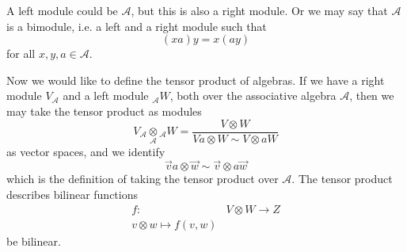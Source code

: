 \begin{ex}
A left module could be $\mathscr{A}$, but this is also a right
module. Or we may say that $\mathscr{A}$ is a bimodule, i.e. a
left and a right module such that
\begin{equation}
(xa)y=x(ay)
\end{equation}
for all $x,y,a\in\mathscr{A}$.
\end{ex}

Now we would like to define the tensor product of algebras. If we
have a right module $V_{\mathscr{A}}$ and a left module
${}_{\mathscr{A}}W$, both over the associative algebra
$\mathscr{A}$, then we may take the tensor product as modules
\begin{equation}
V_{\mathscr{A}}\mathop{\otimes}\limits_{\mathscr{A}} {}_{\mathscr{A}}W =
\frac{V\otimes W}{Va\otimes W\sim V\otimes aW}
\end{equation}
as vector spaces, and we identify 
\begin{equation}
\vec{v}a\otimes\vec{w}\sim\vec{v}\otimes a\vec{w}
\end{equation}
which is the definition of taking the tensor product over
$\mathscr{A}$. The tensor product describes bilinear functions
\begin{subequations}
\begin{align}
f\colon&V\otimes W\to Z\\
v\otimes w\mapsto f(v,w)
\end{align}
\end{subequations}
be bilinear.

